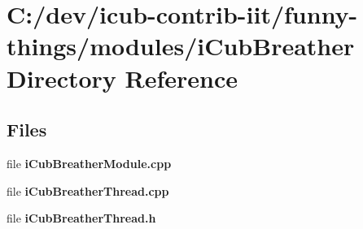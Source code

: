 \section{C\+:/dev/icub-\/contrib-\/iit/funny-\/things/modules/i\+Cub\+Breather Directory Reference}
\label{dir_b2138086760751ed5b6c2f534d2e016b}
\subsection*{Files}
\begin{DoxyCompactItemize}
\item 
file {\bfseries i\+Cub\+Breather\+Module.\+cpp}
\item 
file {\bfseries i\+Cub\+Breather\+Thread.\+cpp}
\item 
file {\bfseries i\+Cub\+Breather\+Thread.\+h}
\end{DoxyCompactItemize}
